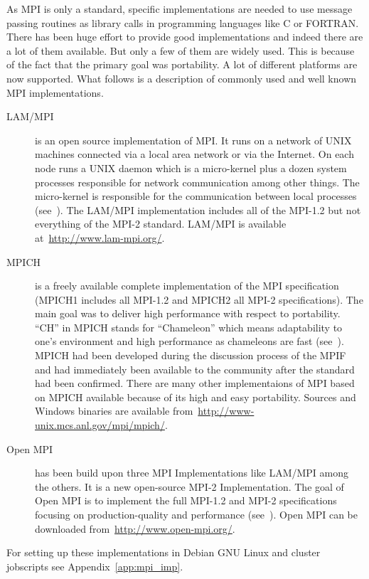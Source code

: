 As MPI is only a standard, specific implementations are needed to use
message passing routines as library calls in programming languages
like C or FORTRAN. There has been huge effort to provide good
implementations and indeed there are a lot of them available. But
only a few of them are widely used. This is because of the fact that
the primary goal was portability. A lot of different platforms are now
supported. What follows is a description of commonly used and well
known MPI implementations.

\begin{description}
\item[LAM/MPI] is an open source implementation of MPI. It runs on a
  network of UNIX machines connected via a local area network or via
  the Internet. On each node runs a UNIX daemon which is a
  micro-kernel plus a dozen system processes responsible for network
  communication among other things. The micro-kernel is
  responsible for the communication between local processes
  (see~\cite{burns94lam}). The LAM/MPI implementation includes all of
  the MPI-1.2 but not everything of the MPI-2 standard. LAM/MPI is
  available at~\url{http://www.lam-mpi.org/}.
\item[MPICH] is a freely available complete implementation of the MPI
  specification (MPICH1 includes all MPI-1.2 and MPICH2 all MPI-2
  specifications). The main goal was to deliver high performance with
  respect to portability. ``CH'' in MPICH stands for ``Chameleon''
  which means adaptability to one's environment and high performance
  as chameleons are fast (see~\cite{gropp96mpich}). MPICH had been
  developed during the discussion process of the MPIF and had immediately been
  available to the community after the standard had been
  confirmed. There are many other implementaions of MPI based on MPICH
  available because of its high and easy portability. Sources and
  Windows binaries are available
  from~\url{http://www-unix.mcs.anl.gov/mpi/mpich/}.
\item[Open MPI] has been build upon three MPI Implementations like
  LAM/MPI among the others. It is a new open-source MPI-2
  Implementation. The goal of Open MPI is to implement the full
  MPI-1.2 and MPI-2 specifications focusing on production-quality and
  performance (see~\cite{gabriel04:_open_mpi}). Open MPI can be
  downloaded from~\url{http://www.open-mpi.org/}.
\end{description}

For setting up these implementations in Debian GNU Linux and cluster
jobscripts see Appendix~\ref{app:mpi_imp}. 


